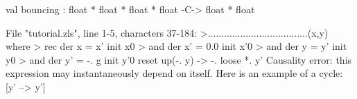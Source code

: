 \chklistingfalse
{}
\begin{ChkListingMsg}
val bouncing : float * float * float * float -C-> float * float
\end{ChkListingMsg}
\begin{ChkListingErr}
File "tutorial.zls", line 1-5, characters 37-184:
>.....................................(x,y) where
> rec der x = x' init x0
> and der x' = 0.0 init x'0
> and der y = y' init y0
> and der y' = -. g init y'0 reset up(-. y) -> -. loose *. y'
Causality error: this expression may instantaneously depend on itself.
Here is an example of a cycle:
[y' --> y']
\end{ChkListingErr}
